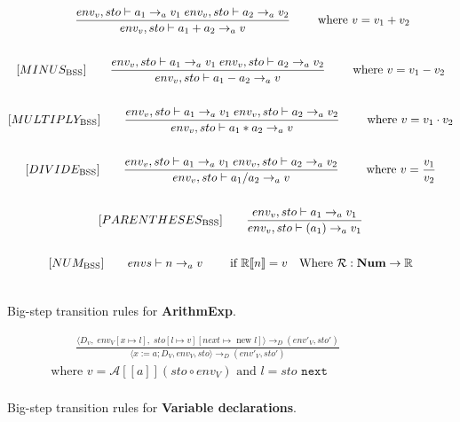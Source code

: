 \begin{figure}[htbp]
	\centering
	\begin{gather*}
		[PLUS_\text{BSS}] 
		\qquad \dfrac
		{\envs \vdash a_1 \rightarrow_a v_1 \; \envs \vdash a_2 \rightarrow_a v_2}
		{\envs \vdash a_1 + a_2 \rightarrow_a v}
		\qquad \text{ where }v = v_1 + v_2
		\\
		\\
		[MINUS_\text{BSS}] 
		\qquad \dfrac
		{\envs \vdash a_1 \rightarrow_a v_1 \; \envs \vdash a_2 \rightarrow_a v_2}
		{\envs \vdash a_1 - a_2 \rightarrow_a v}
		\qquad \text{ where }v = v_1 - v_2
		\\
		\\
		[MULTIPLY_\text{BSS}] 
		\qquad \dfrac
		{\envs \vdash a_1 \rightarrow_a v_1 \; \envs \vdash a_2 \rightarrow_a v_2}
		{\envs \vdash a_1 * a_2 \rightarrow_a v}
		\qquad \text{ where }v = v_1 \cdot v_2
		\\
		\\
		[DIVIDE_\text{BSS}] 
		\qquad \dfrac
		{\envs \vdash a_1 \rightarrow_a v_1 \; \envs \vdash a_2 \rightarrow_a v_2}
		{\envs \vdash a_1 / a_2 \rightarrow_a v}
		\qquad \text{ where }v = \dfrac{v_1}{v_2}
		\\
		\\
		[PARENTHESES_\text{BSS}] 
		\qquad \dfrac
		{\envs \vdash a_1 \rightarrow_a v_1}
		{\envs \vdash (a_1) \rightarrow_a v_1}
		\\
		\\
		[NUM_\text{BSS}] 
		\qquad envs \vdash n \rightarrow_a v
		\qquad \text{ if } \mathbb{R}[\![n]\!] = v \quad \text{Where } \mathcal{R}:\textbf{Num}\rightarrow \mathbb{R}
		\\
		\\
	\end{gather*}
	\caption{Big-step transition rules for \textbf{ArithmExp}.}
	\label{fig:BssArithm}
\end{figure}

\begin{figure}[htbp]
	\centering
	\begin{gather*}
		[VAR_\text{BSS}]
		\qquad 
		\frac
		{\langle D_v,\; env_V[x \mapsto l], \; sto[l \mapsto v][next \mapsto \text{ new } l]\rangle \rightarrow_D (env'_V, sto')}
		{\langle x:=a; D_V, env_V, sto \rangle \rightarrow_D (env'_V, sto')} \\
		\text{where } v = \mathcal{A}[\![a]\!](sto\circ env_V ) \text{ and } l = \textit{sto } \texttt{next}
		\\
	\end{gather*}
	\caption{Big-step transition rules for \textbf{Variable declarations}.}
	\label{fig:BssStm}
\end{figure}

